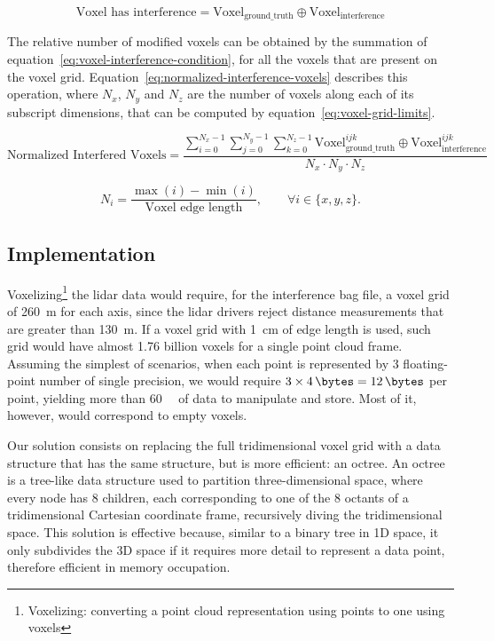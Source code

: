 \begin{equation}
	\label{eq:voxel-interference-condition}
	\text{Voxel has interference} = \text{Voxel}_\text{ground\_truth} \oplus  \text{Voxel}_\text{interference} 
\end{equation}

The relative number of modified voxels can be obtained by the summation of equation~\ref{eq:voxel-interference-condition}, for all the voxels that are present on the voxel grid. Equation~\ref{eq:normalized-interference-voxels} describes this operation, where $N_x$, $N_y$ and $N_z$ are the number of voxels along each of its subscript dimensions, that can be computed by equation~\ref{eq:voxel-grid-limits}.

\begin{equation}
\label{eq:normalized-interference-voxels}
\text{Normalized Interfered Voxels} =\displaystyle \frac{\sum\limits^{N_x - 1}_{i = 0} \sum\limits^{N_y - 1}_{j = 0} \sum\limits^{N_z - 1}_{k = 0} \text{Voxel}_\text{ground\_truth}^{ijk} \oplus  \text{Voxel}_\text{interference}^{ijk}}{N_x\cdot N_y\cdot N_z}
\end{equation}

\begin{equation}
\label{eq:voxel-grid-limits}
N_i = \frac{\max(i) - \min(i)}{\text{Voxel edge length}}, \qquad \forall i \in \{x, y, z\}.
\end{equation}

\subsection{Implementation}
Voxelizing\footnote{Voxelizing: converting a point cloud representation using points to one using voxels} the \ac{lidar} data would require, for the interference bag file, a voxel grid of \SI{260}{\meter} for each axis, since the \ac{lidar} drivers reject distance measurements that are greater than \SI{130}{\meter}. If a voxel grid with \SI{1}{\centi\meter} of edge length is used, such grid would have almost 1.76 billion voxels for a single point cloud frame. Assuming the simplest of scenarios, when each point is represented by 3 floating-point number of single precision, we would require $3\times \SI{4}{\bytes} = \SI{12}{\bytes}$ per point, yielding more than \SI{60}{\giga\byte} of data to manipulate and store. Most of it, however, would correspond to empty voxels.

Our solution consists on replacing the full tridimensional voxel grid with a data structure that has the same structure, but is more efficient: an octree. An octree is a tree-like data structure used to partition three-dimensional space, where every node has 8 children, each corresponding to one of the 8 octants of a tridimensional Cartesian coordinate frame, recursively diving the tridimensional space. This solution is effective because, similar to a binary tree in 1D space, it only subdivides the 3D space if it requires more detail to represent a data point, therefore efficient in memory occupation.

